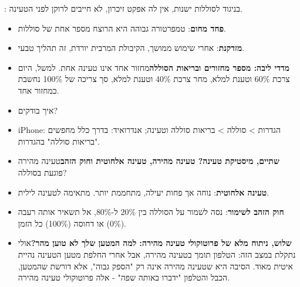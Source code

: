 


: בניגוד לסוללות ישנות, אין לה אפקט זיכרון, לא חייבים לרוקן לפני הטעינה.

\begin{itemize}
  \item \textbf{פחד מחום}: טמפרטורה גבוהה היא הרוצח מספר אחת של סוללות.
  \item \textbf{מזדקנת}: אחרי שימוש ממושך, הקיבולת המרבית יורדת, זה תהליך טבעי.
  \item \textbf{מדדי ליבה: מספר מחזורים ובריאות הסוללה}מחזור אחד אינו טעינה אחת. למשל, היום צרכת 60\% וטענת למלא, מחר צרכת 40\% וטענת למלא, סך צריכה של 100\% נחשבת כמחזור אחד.
\end{itemize}


\begin{itemize}
  \item איך בודקים?
  \item iPhone: הגדרות > סוללה > בריאות סוללה וטעינה; אנדרואיד: בדרך כלל מחפשים "בריאות סוללה" בהגדרות.
  \item \textbf{שתיים, מיסטיקת טעינה? טעינה מהירה, טעינה אלחוטית וחוק הזהב}טעינה מהירה פוגעת בסוללה?
\end{itemize}


\begin{itemize}
  \item \textbf{טעינה אלחוטית}: נוחה אך פחות יעילה, מתחממת יותר. מתאימה לטעינה לילית.
  \item \textbf{חוק הזהב לשימור}: נסה לשמור על הסוללה בין 20\% ל-80\%, אל תשאיר אותה רעבה (0\%) או דחוסה (100\%) כל הזמן.
  \item \textbf{שלוש, ניתוח מלא של פרוטוקולי טעינה מהירה: למה המטען שלך לא טוען מהר?}אולי נתקלת במצב הזה: הטלפון תומך בטעינה מהירה, אבל אחרי החלפת מטען הטעינה נהיית איטית מאוד. הסיבה היא שטעינה מהירה אינה רק "הספק גבוה", אלא דורשת שהמטען, הכבל והטלפון "ידברו באותה שפה" - אלה פרוטוקולי טעינה מהירה.
\end{itemize}

